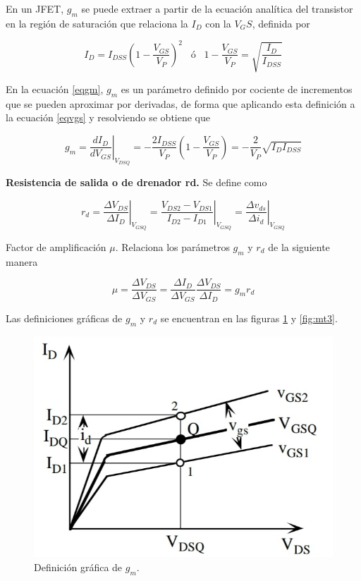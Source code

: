 \documentclass[12pt, a4paper]{article}
\begin{document}
    En un JFET, $g_m$ se puede extraer a partir de la ecuación analítica del transistor en la región de saturación que relaciona la $I_D$ con la $V_GS$, definida por

    \begin{equation} \label{eqvgs}
        I_D = I_{DSS}\left(1-\frac{V_{GS}}{V_P}\right)^2 \;\;\; ó \;\;\; 1-\frac{V_{GS}}{V_P} = \sqrt{\frac{I_D}{I_{DSS}}}
    \end{equation}

    En la ecuación \eqref{eqgm}, $g_m$ es un parámetro definido por cociente de incrementos que se pueden aproximar por derivadas, de forma que aplicando esta definición a la ecuación \eqref{eqvgs} y resolviendo se obtiene que

    \begin{equation} \label{eqdgm}
        g_m = \left.\frac{d I_D}{d V_{GS}}\right|_{V_{DSQ}} = -\frac{2I_{DSS}}{V_P}\left(1-\frac{V_{GS}}{V_P}\right) = -\frac{2}{V_P}\sqrt{I_DI_{DSS}}
    \end{equation}

    {\bf Resistencia de salida o de drenador rd.} Se define como

    \begin{equation} \label{eqrd}
        r_d = \left.\frac{\Delta V_{DS}}{\Delta I_D}\right|_{V_{GSQ}} = \left.\frac{V_{DS2}-V_{DS1}}{I_{D2}-I_{D1}}\right|_{V_{GSQ}} = \left.\frac{\Delta v_{ds}}{\Delta i_d}\right|_{V_{GSQ}}
    \end{equation}

    Factor de amplificación $\mu$. Relaciona los parámetros $g_m$ y $r_d$ de la siguiente manera

    \begin{equation} \label{eqmu}
        \mu = \frac{\Delta V_{DS}}{\Delta V_{GS}} = \frac{\Delta I_D}{\Delta V_{GS}}\frac{\Delta V_{DS}}{\Delta I_D} = g_mr_d
    \end{equation}

    Las definiciones gráficas de $g_m$ y $r_d$ se encuentran en las figuras \ref{fig:mt2} y \ref{fig:mt3}.

    \begin{figure}[h!]
        \centering
        \includegraphics[height=5cm\textwidth]{grafgm.jpg}
        \caption{Definición gráfica de $g_m$.}
        \label{fig:mt2}
    \end{figure}
\end{document}

